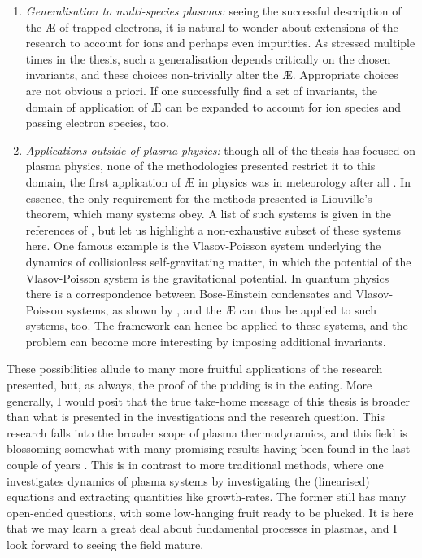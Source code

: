 \begin{enumerate}
    \item {\it Generalisation to multi-species plasmas:} seeing the successful description of the \AE{} of trapped electrons, it is natural to wonder about extensions of the research to account for ions and perhaps even impurities. As stressed multiple times in the thesis, such a generalisation depends critically on the chosen invariants, and these choices non-trivially alter the \AE{}. Appropriate choices are not obvious a priori. If one successfully find a set of invariants, the domain of application of \AE{} can be expanded to account for ion species and passing electron species, too. 
    \item {\it Applications outside of plasma physics:} though all of the thesis has focused on plasma physics, none of the methodologies presented restrict it to this domain, the first application of \AE{} in physics was in meteorology after all \cite{lorenz1955available}. In essence, the only requirement for the methods presented is Liouville's theorem, which many systems obey. A list of such systems is given in the references of \cite{kolmes2020available,mackenbach2022available}, but let us highlight a non-exhaustive subset of these systems here. One famous example is the Vlasov-Poisson system underlying the dynamics of collisionless self-gravitating matter, in which the potential of the Vlasov-Poisson system is the gravitational potential. In quantum physics there is a correspondence between Bose-Einstein condensates and Vlasov-Poisson systems, as shown by \citet{mocz2018schrodinger}, and the \AE{} can thus be applied to such systems, too. The framework can hence be applied to these systems, and the problem can become more interesting by imposing additional invariants.
\end{enumerate}
These possibilities allude to many more fruitful applications of the research presented, but, as always, the proof of the pudding is in the eating. More generally, I would posit that the true take-home message of this thesis is broader than what is presented in the investigations and the research question. This research falls into the broader scope of plasma thermodynamics, and this field is blossoming somewhat with many promising results having been found in the last couple of years \cite{helander2017available,helander2020available,kolmes2020recovering,helander2022energetic,plunk2022energetic,kolmes2022minimum,ewart2022collisionless,plunk2023energetic,ewart2023non}. This is in contrast to more traditional methods, where one investigates dynamics of plasma systems by investigating the (linearised) equations and extracting quantities like growth-rates. The former still has many open-ended questions, with some low-hanging fruit ready to be plucked. It is here that we may learn a great deal about fundamental processes in plasmas, and I look forward to seeing the field mature.